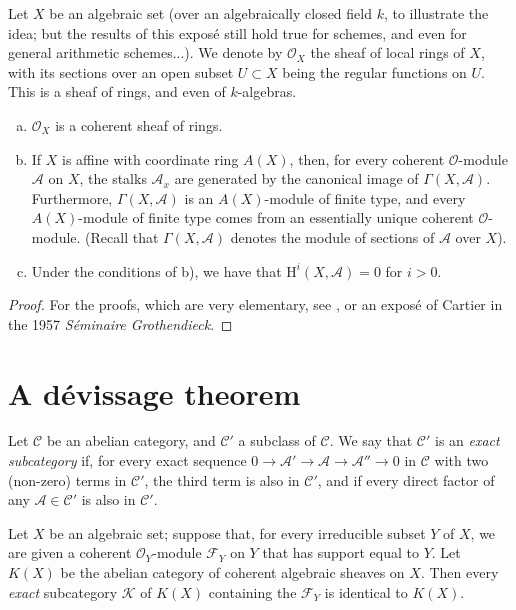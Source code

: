 \documentclass{article}
\theoremstyle{plain}
\newenvironment{theorem}[1]
  {\renewcommand\theinnercustomtheorem{#1}\innercustomtheorem}
  {\endinnercustomtheorem}
\theoremstyle{definition}
\newenvironment{definition}[1]
  {\renewcommand\theinnercustomdefinition{#1}\innercustomdefinition}
  {\endinnercustomdefinition}
\newcommand{\sh}{\mathscr}
\newcommand{\cat}{\mathcal}
\newcommand{\HH}{\mathrm{H}}
\newcommand{\oldpage}[1]{\marginpar{\footnotesize$\Big\vert$ \textit{p.~#1}}}
\begin{document}
Let $X$ be an algebraic set (over an algebraically closed field $k$, to illustrate the idea; but the results of this exposé still hold true for schemes, and even for general arithmetic schemes...).
We denote by $\sh{O}_X$ the sheaf of local rings of $X$, with its sections over an open subset $U\subset X$ being the regular functions on $U$.
This is a sheaf of rings, and even of $k$-algebras.

\begin{theorem}{1}
\label{theorem1}
\begin{enumerate}[(a)]
  \item $\sh{O}_X$ is a coherent sheaf of rings.
  \item If $X$ is affine with coordinate ring $A(X)$, then, for every coherent $\sh{O}$-module $\sh{A}$ on $X$, the stalks $\sh{A}_x$ are generated by the canonical image of $\Gamma(X,\sh{A})$.
    Furthermore, $\Gamma(X,\sh{A})$ is an $A(X)$-module of finite type, and every $A(X)$-module of finite type comes from an essentially unique coherent $\sh{O}$-module.
    (Recall that $\Gamma(X,\sh{A})$ denotes the module of sections of $\sh{A}$ over $X$).
  \item Under the conditions of b), we have that $\HH^i(X,\sh{A})=0$ for $i>0$.
\oldpage{2-02}
\end{enumerate}
\end{theorem}

\begin{proof}
  For the proofs, which are very elementary, see \cite[chapitre~2, paragraphes~2,3,4]{1}, or an exposé of Cartier in the 1957 \emph{Séminaire Grothendieck}.
\end{proof}


\section{A dévissage theorem}
\label{section2}

\begin{definition}{1}
\label{definition1}
  Let $\cat{C}$ be an abelian category, and $\cat{C}'$ a subclass of $\cat{C}$.
  We say that $\cat{C}'$ is an \emph{exact subcategory} if, for every exact sequence $0\to\sh{A}'\to\sh{A}\to\sh{A}''\to0$ in $\cat{C}$ with two (non-zero) terms in $\cat{C}'$, the third term is also in $\cat{C}'$, and if every direct factor of any $\sh{A}\in\cat{C}'$ is also in $\cat{C}'$.
\end{definition}

\begin{theorem}{2}
\label{theorem2}
  Let $X$ be an algebraic set;
  suppose that, for every irreducible subset $Y$ of $X$, we are given a coherent $\sh{O}_Y$-module $\sh{F}_Y$ on $Y$ that has support equal to $Y$.
  Let $K(X)$ be the abelian category of coherent algebraic sheaves on $X$.
  Then every \emph{exact} subcategory $\cat{K}$ of $K(X)$ containing the $\sh{F}_Y$ is identical to $K(X)$.
\end{theorem}
\end{document}
